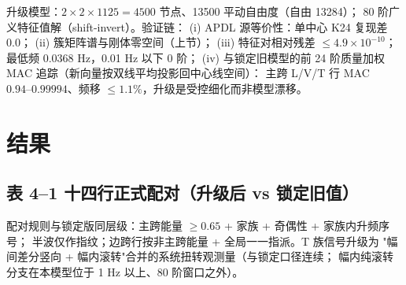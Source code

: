 \documentclass[11pt,a4paper]{ctexart}
\begin{document}
升级模型：$2\times2\times1125=4500$ 节点、13500 平动自由度（自由 13284）；
80 阶广义特征值解（shift-invert）。验证链：
(i) APDL 源等价性：单中心 K24 复现差 0.0；
(ii) 簇矩阵谱与刚体零空间（上节）；
(iii) 特征对相对残差 $\le4.9\times10^{-10}$；最低频 0.0368 Hz，0.01 Hz 以下 0 阶；
(iv) 与锁定旧模型的前 24 阶质量加权 MAC 追踪（新向量按双线平均投影回中心线空间）：
主跨 L/V/T 行 MAC $0.94\text{--}0.99994$、频移 $\le1.1\%$，升级是受控细化而非模型漂移。

\section{结果}\label{sec:results}

\subsection{表 4--1 十四行正式配对（升级后 vs 锁定旧值）}

配对规则与锁定版同层级：主跨能量 $\ge0.65$ + 家族 + 奇偶性 + 家族内升频序号；
半波仅作指纹；边跨行按非主跨能量 + 全局一一指派。T 族信号升级为
"幅间差分竖向 + 幅内滚转"合并的系统扭转观测量（与锁定口径连续；
幅内纯滚转分支在本模型位于 1 Hz 以上、80 阶窗口之外）。
\end{document}
